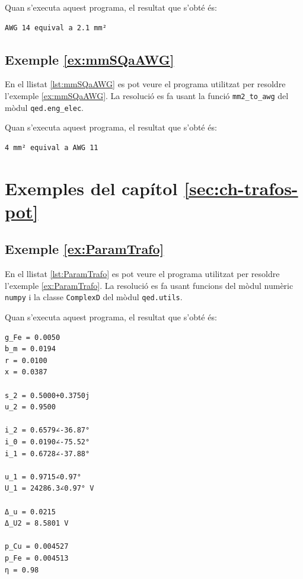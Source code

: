 Quan s'executa aquest programa, el resultat que s'obté és:
\lstset{
	language=,
	numbers=none,
	frame=none
}
\begin{lstlisting}
AWG 14 equival a 2.1 mm²
\end{lstlisting} 



\hypertarget{exemple:mmSQaAWG}{\subsection{Exemple \ref*{ex:mmSQaAWG} \mmSQaAWG}}
En el llistat \vref{lst:mmSQaAWG} es pot veure el programa utilitzat per resoldre l'exemple \vref{ex:mmSQaAWG}. La resolució es fa usant la funció \texttt{mm2\_to\_awg} del mòdul \texttt{qed.eng\_elec}.


Quan s'executa aquest programa, el resultat que s'obté és:
\lstset{
	language=,
	numbers=none,
	frame=none
}
\begin{lstlisting}
4 mm² equival a AWG 11
\end{lstlisting} 





\section{Exemples del capítol \ref*{sec:ch-trafos-pot}}

\hypertarget{exemple:ParamTrafo}{\subsection{Exemple \ref*{ex:ParamTrafo} \ParamTrafo}}
En el llistat \vref{lst:ParamTrafo} es pot veure el programa utilitzat per resoldre l'exemple \vref{ex:ParamTrafo}. La resolució es fa usant funcions del mòdul numèric \texttt{numpy} i la classe  \texttt{ComplexD} del mòdul \texttt{qed.utils}.


Quan s'executa aquest programa, el resultat que s'obté és:
\lstset{
	language=,
	numbers=none,
	frame=none
}
\begin{lstlisting}
g_Fe = 0.0050
b_m = 0.0194
r = 0.0100
x = 0.0387

s_2 = 0.5000+0.3750j
u_2 = 0.9500

i_2 = 0.6579∠-36.87°
i_0 = 0.0190∠-75.52°
i_1 = 0.6728∠-37.88°

u_1 = 0.9715∠0.97°
U_1 = 24286.3∠0.97° V

Δ_u = 0.0215
Δ_U2 = 8.5801 V

p_Cu = 0.004527
p_Fe = 0.004513
η = 0.98
\end{lstlisting} 

